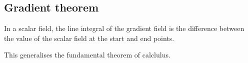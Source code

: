 
\subsection{Gradient theorem}

In a scalar field, the line integral of the gradient field is the difference between the value of the scalar field at the start and end points.

This generalises the fundamental theorem of calclulus.


